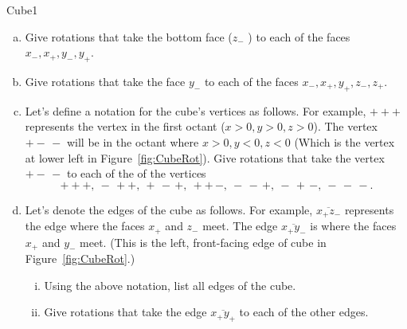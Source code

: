 \begin {exercise}{Cube1}
\begin {enumerate}[(a)]
\item Give rotations that take the bottom face ($z_-$ ) to each of the faces $x_-,x_+,y_-,y_+$.
\item Give rotations that take the face $y_- $ to each of the faces $x_-,x_+,y_+,z_-,z_+$.
\item Let's define a notation for the cube's vertices as follows.  For example, $+++$ represents the vertex in the first octant ($x>0,y>0,z>0$).  The vertex $+-\,-$ will be in the octant where $x>0,y<0,z<0$ (Which is the vertex at lower left in Figure~\ref{fig:CubeRot}).  Give rotations that take the vertex $+-\,-$ to each of the of the vertices 
\[ +++, ~-\,++,~+\,-\,+,~ ++\,-,~-\,-\,+,~-\,+\,-,~-\,-\,-. \]

\item Let's denote the edges of the cube as follows.  For example, $\overline{x_+z_-}$ represents the edge where the faces $x_+$ and $z_-$ meet.  The edge $\overline{x_+y_-}$ is where the faces $x_+$ and $y_-$ meet.  (This is the left, front-facing edge of cube in Figure~\ref{fig:CubeRot}.)  
\begin {enumerate}[(i)]
\item Using the above notation, list all edges of the cube.
\item Give rotations that take the edge $\overline{x_+y_+}$ to each of the other edges. 
\end {enumerate}
\end{enumerate}
\end{exercise} 
